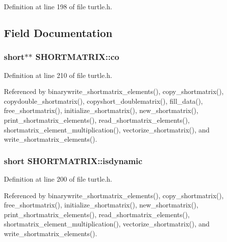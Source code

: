 Definition at line 198 of file turtle.\-h.



\subsection{Field Documentation}
\hypertarget{struct_s_h_o_r_t_m_a_t_r_i_x_a245df1fe191ac8b924ca87409c637573}{
\subsubsection[{co}]{\setlength{\rightskip}{0pt plus 5cm}short$\ast$$\ast$ S\-H\-O\-R\-T\-M\-A\-T\-R\-I\-X\-::co}}\label{struct_s_h_o_r_t_m_a_t_r_i_x_a245df1fe191ac8b924ca87409c637573}


Definition at line 210 of file turtle.\-h.



Referenced by binarywrite\-\_\-shortmatrix\-\_\-elements(), copy\-\_\-shortmatrix(), copydouble\-\_\-shortmatrix(), copyshort\-\_\-doublematrix(), fill\-\_\-data(), free\-\_\-shortmatrix(), initialize\-\_\-shortmatrix(), new\-\_\-shortmatrix(), print\-\_\-shortmatrix\-\_\-elements(), read\-\_\-shortmatrix\-\_\-elements(), shortmatrix\-\_\-element\-\_\-multiplication(), vectorize\-\_\-shortmatrix(), and write\-\_\-shortmatrix\-\_\-elements().

\hypertarget{struct_s_h_o_r_t_m_a_t_r_i_x_aac64a80e3baae1513a4837f79a6dc344}{
\subsubsection[{isdynamic}]{\setlength{\rightskip}{0pt plus 5cm}short S\-H\-O\-R\-T\-M\-A\-T\-R\-I\-X\-::isdynamic}}\label{struct_s_h_o_r_t_m_a_t_r_i_x_aac64a80e3baae1513a4837f79a6dc344}


Definition at line 200 of file turtle.\-h.



Referenced by binarywrite\-\_\-shortmatrix\-\_\-elements(), copy\-\_\-shortmatrix(), free\-\_\-shortmatrix(), initialize\-\_\-shortmatrix(), new\-\_\-shortmatrix(), print\-\_\-shortmatrix\-\_\-elements(), read\-\_\-shortmatrix\-\_\-elements(), shortmatrix\-\_\-element\-\_\-multiplication(), vectorize\-\_\-shortmatrix(), and write\-\_\-shortmatrix\-\_\-elements().

